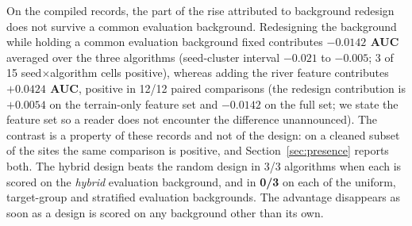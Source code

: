 \documentclass[12pt]{article}
\begin{document}
On the compiled records, the part of the rise attributed to background redesign does not survive a common evaluation background.
Redesigning the background while holding a common evaluation background fixed contributes \textbf{$-0.0142$ AUC} averaged over the three algorithms (seed-cluster interval $-0.021$ to $-0.005$; 3 of 15 seed$\times$algorithm cells positive), whereas adding the river feature contributes \textbf{$+0.0424$ AUC}, positive in 12/12 paired comparisons (the redesign contribution is $+0.0054$ on the terrain-only feature set and $-0.0142$ on the full set; we state the feature set so a reader does not encounter the difference unannounced).
The contrast is a property of these records and not of the design: on a cleaned subset of the sites the same comparison is positive, and Section~\ref{sec:presence} reports both.
The hybrid design beats the random design in 3/3 algorithms when each is scored on the \emph{hybrid} evaluation background, and in \textbf{0/3} on each of the uniform, target-group and stratified evaluation backgrounds.
The advantage disappears as soon as a design is scored on any background other than its own.
\end{document}
